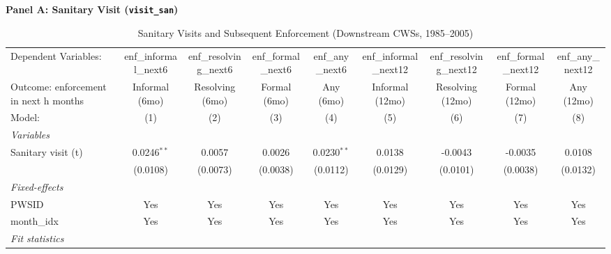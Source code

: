 \begin{table}[htbp]
\caption{\label{tab:visit_to_enf} Sanitary Visits and Subsequent Enforcement (Downstream CWSs, 1985--2005)}
\bigskip
\centering
\textbf{Panel A: Sanitary Visit (\texttt{visit\_san})}\\[4pt]
\begin{adjustbox}{width = \textwidth, center}
\begingroup
\centering
\begin{tabular}{lcccccccc}
   \tabularnewline \midrule \midrule
   Dependent Variables:                  & enf\_informal\_next6   & enf\_resolving\_next6   & enf\_formal\_next6    & enf\_any\_next6       & enf\_informal\_next12   & enf\_resolving\_next12   & enf\_formal\_next12   & enf\_any\_next12\\    
   Outcome: enforcement in next h months & Informal (6mo)         & Resolving (6mo)         & Formal (6mo)          & Any (6mo)             & Informal (12mo)         & Resolving (12mo)         & Formal (12mo)         & Any (12mo) \\   
   Model:                                & (1)                    & (2)                     & (3)                   & (4)                   & (5)                     & (6)                      & (7)                   & (8)\\  
   \midrule
   \emph{Variables}\\
   Sanitary visit (t)                    & 0.0246$^{**}$          & 0.0057                  & 0.0026                & 0.0230$^{**}$         & 0.0138                  & -0.0043                  & -0.0035               & 0.0108\\   
                                         & (0.0108)               & (0.0073)                & (0.0038)              & (0.0112)              & (0.0129)                & (0.0101)                 & (0.0038)              & (0.0132)\\   
   \midrule
   \emph{Fixed-effects}\\
   PWSID                                 & Yes                    & Yes                     & Yes                   & Yes                   & Yes                     & Yes                      & Yes                   & Yes\\  
   month\_idx                            & Yes                    & Yes                     & Yes                   & Yes                   & Yes                     & Yes                      & Yes                   & Yes\\  
   \midrule
   \emph{Fit statistics}\\

\end{tabular}
\end{adjustbox}
\end{table}
